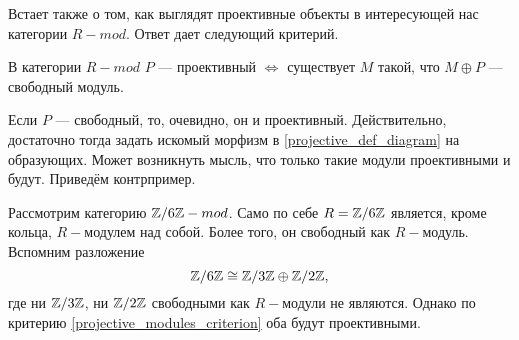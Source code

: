 \documentclass[../hw_main.tex]{subfiles}
\begin{document}
Встает также о том, как выглядят проективные объекты в интересующей нас категории $R-mod$. Ответ дает следующий критерий.
\begin{to_suj}\label{projective_modules_criterion}
В категории $R-mod$ $P$ --- проективный $\iff$ существует $M$ такой, что $M\oplus P$ --- свободный модуль.
\end{to_suj}
\begin{to_com}
Если $P$ --- свободный, то, очевидно, он и проективный. Действительно, достаточно тогда задать искомый морфизм в \eqref{projective_def_diagram} на образующих. Может возникнуть мысль, что только такие модули проективными и будут. Приведём контрпример.
\end{to_com}
\begin{to_ex}
Рассмотрим категорию $\mathbb{Z}/6\mathbb{Z}-mod$. Само по себе $R = \mathbb{Z}/6\mathbb{Z}$ является, кроме кольца, $R-$модулем над собой. Более того, он свободный как $R-$модуль. Вспомним разложение
\begin{equation*}
    \mathbb{Z}/6\mathbb{Z} \cong \mathbb{Z}/3\mathbb{Z} \oplus \mathbb{Z}/2\mathbb{Z},
\end{equation*}
где ни $\mathbb{Z}/3\mathbb{Z}$, ни $\mathbb{Z}/2\mathbb{Z}$ свободными как $R-$модули не являются. Однако по критерию \ref{projective_modules_criterion} оба будут проективными.
\end{to_ex}
\end{document}
